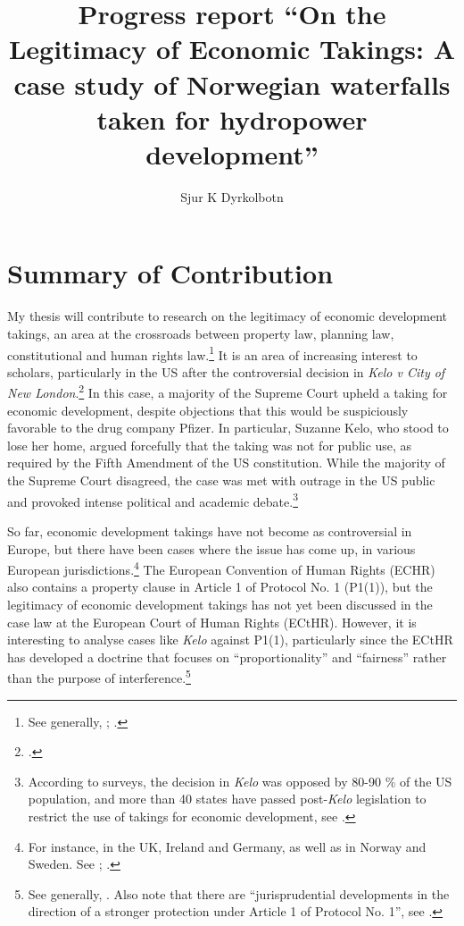 \documentclass[12pt,a4paper]{article} %
\title{Progress report ``On the Legitimacy of Economic Takings: A case study of Norwegian waterfalls taken for hydropower development''}
\author{Sjur K Dyrkolbotn}
\date{} %
\begin{document}
\maketitle

\section*{Summary of Contribution}

My thesis will contribute to research on the legitimacy of economic development takings, an area at the crossroads between property law, planning law, constitutional and human rights law.\footnote{See generally, \cite[Chapter 12]{epstein85};  \cite{merrill86,malloy08}.} It is an area of increasing interest to scholars, particularly in the US after the controversial decision in {\it Kelo v City of New London}.\footcite{kelo05} In this case, a majority of the Supreme Court upheld a taking for economic development, despite objections that this would be suspiciously favorable to the drug company Pfizer. In particular, Suzanne Kelo, who stood to lose her home, argued forcefully that the taking was not for public use, as required by the Fifth Amendment of the US constitution. While the majority of the Supreme Court disagreed, the case was met with outrage in the US public and provoked intense political and academic debate.\footnote{According to surveys, the decision in {\it Kelo} was opposed by 80-90 \% of the US population, and more than 40 states have passed post-{\it Kelo} legislation to restrict the use of takings for economic development, see \cite{somin09}.}

So far, economic development takings have not become as controversial in Europe, but there have been cases where the issue has come up, in various European jurisdictions.\footnote{For instance, in the UK, Ireland and Germany, as well as in Norway and Sweden. See \cite[466-483]{walt11}; \cite{stenseth10}.} The European Convention of Human Rights (ECHR) also contains a property clause in Article 1 of Protocol No. 1 (P1(1)), but the legitimacy of economic development takings has not yet been discussed in the case law at the European Court of Human Rights (ECtHR). However, it is interesting to analyse cases like {\it Kelo} against P1(1), particularly since the ECtHR has developed a doctrine that focuses on ``proportionality'' and ``fairness'' rather than the purpose of interference.\footnote{See generally, \cite[Chapter 5]{allen05}. Also note that there are ``jurisprudential developments in the direction of a stronger protection under Article 1 of Protocol No. 1'', see \cite[135]{lindheim12}.}
\end{document}
